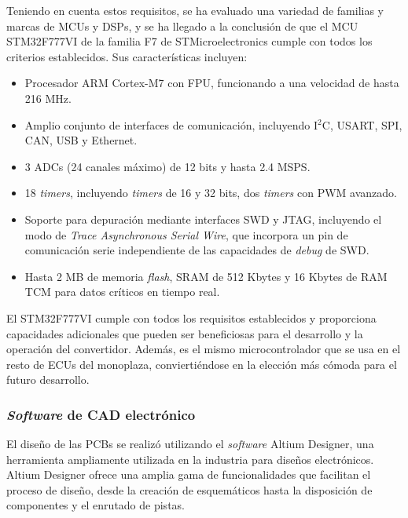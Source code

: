Teniendo en cuenta estos requisitos, se ha evaluado una variedad de familias y marcas de MCUs y DSPs, y se ha llegado a la conclusión de que el MCU STM32F777VI de la familia F7 de STMicroelectronics cumple con todos los criterios establecidos. Sus características incluyen:

\begin{itemize}
	\item Procesador ARM Cortex-M7 con FPU, funcionando a una velocidad de hasta 216 MHz.
	\item Amplio conjunto de interfaces de comunicación, incluyendo I$^2$C, USART, SPI, CAN, USB y Ethernet.
	\item 3 ADCs (24 canales máximo) de 12 bits y hasta 2.4 MSPS.
	\item 18 \textit{timers}, incluyendo \textit{timers} de 16 y 32 bits, dos \textit{timers} con PWM avanzado.
	\item Soporte para depuración mediante interfaces SWD y JTAG, incluyendo el modo de \textit{Trace Asynchronous Serial Wire}, que incorpora un pin de comunicación serie independiente de las capacidades de \textit{debug} de SWD.
	\item Hasta 2 MB de memoria \textit{flash}, SRAM de 512 Kbytes y 16 Kbytes de RAM TCM para datos críticos en tiempo real.
\end{itemize}

El STM32F777VI cumple con todos los requisitos establecidos y proporciona capacidades adicionales que pueden ser beneficiosas para el desarrollo y la operación del convertidor. Además, es el mismo microcontrolador que se usa en el resto de ECUs del monoplaza, conviertiéndose en la elección más cómoda para el futuro desarrollo.


\subsubsection{\textit{Software} de CAD electrónico}

El diseño de las PCBs se realizó utilizando el \textit{software} Altium Designer, una herramienta ampliamente utilizada en la industria para diseños electrónicos. Altium Designer ofrece una amplia gama de funcionalidades que facilitan el proceso de diseño, desde la creación de esquemáticos hasta la disposición de componentes y el enrutado de pistas.

